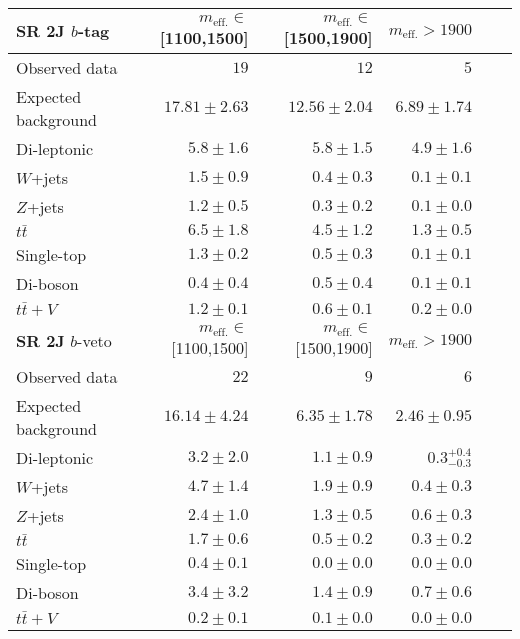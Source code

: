 \begin{tabular*}{\textwidth}{@{\extracolsep{\fill}}lrrrrr}
\toprule
\textbf{SR 2J} $b$-tag & $m_{\mathrm{eff.}}\in$[1100,1500] & $m_{\mathrm{eff.}}\in$[1500,1900] & $m_{\mathrm{eff.}}>1900$ \\
\midrule

Observed data          & $19$              & $12$              & $5$                    \\
\midrule
Expected background         & $17.81 \pm 2.63$          & $12.56 \pm 2.04$          & $6.89 \pm 1.74$              \\
\midrule
        Di-leptonic         & $5.8 \pm 1.6$          & $5.8 \pm 1.5$          & $4.9 \pm 1.6$              \\
        $W$+jets         & $1.5 \pm 0.9$          & $0.4 \pm 0.3$          & $0.1 \pm 0.1$              \\
        $Z$+jets         & $1.2 \pm 0.5$          & $0.3 \pm 0.2$          & $0.1 \pm 0.0$              \\
        $t\bar{t}$         & $6.5 \pm 1.8$          & $4.5 \pm 1.2$          & $1.3 \pm 0.5$              \\
        Single-top         & $1.3 \pm 0.2$          & $0.5 \pm 0.3$          & $0.1 \pm 0.1$              \\
        Di-boson         & $0.4 \pm 0.4$          & $0.5 \pm 0.4$          & $0.1 \pm 0.1$              \\
        $t\bar{t}+V$         & $1.2 \pm 0.1$          & $0.6 \pm 0.1$          & $0.2 \pm 0.0$              \\
\toprule
\textbf{SR 2J} $b$-veto & $m_{\mathrm{eff.}}\in$[1100,1500] & $m_{\mathrm{eff.}}\in$[1500,1900] & $m_{\mathrm{eff.}}>1900$ \\
\midrule
Observed data          & $22$              & $9$              & $6$                    \\
\midrule
Expected background         & $16.14 \pm 4.24$          & $6.35 \pm 1.78$          & $2.46 \pm 0.95$              \\
\midrule
        Di-leptonic         & $3.2 \pm 2.0$          & $1.1 \pm 0.9$          & $0.3_{-0.3}^{+0.4}$              \\
        $W$+jets         & $4.7 \pm 1.4$          & $1.9 \pm 0.9$          & $0.4 \pm 0.3$              \\
        $Z$+jets         & $2.4 \pm 1.0$          & $1.3 \pm 0.5$          & $0.6 \pm 0.3$              \\
        $t\bar{t}$         & $1.7 \pm 0.6$          & $0.5 \pm 0.2$          & $0.3 \pm 0.2$              \\
        Single-top         & $0.4 \pm 0.1$          & $0.0 \pm 0.0$          & $0.0 \pm 0.0$              \\
        Di-boson         & $3.4 \pm 3.2$          & $1.4 \pm 0.9$          & $0.7 \pm 0.6$              \\
        $t\bar{t}+V$         & $0.2 \pm 0.1$          & $0.1 \pm 0.0$          & $0.0 \pm 0.0$              \\


\bottomrule
\end{tabular*}




